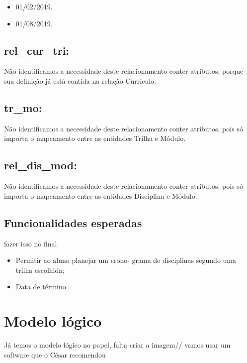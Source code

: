 \documentclass{report}
\begin{document}
\begin{itemize}
	\item 01/02/2019.
	\item 01/08/2019.
\end{itemize}
\subsection{rel\_cur\_tri:}
 Não identificamos a necessidade deste relacionamento conter atributos, porque
 sua definição já está contida na relação Currículo.
\subsection{tr\_mo:}
 Não identificamos a necessidade deste relacionamento conter atributos, pois só
 importa o mapeamento entre as entidades Trilha e Módulo.
\subsection{rel\_dis\_mod:}
 Não identificamos a necessidade deste relacionamento conter atributos, pois só
 importa o mapeamento entre as entidades Disciplina e Módulo.
\subsection{Funcionalidades esperadas}
{\huge fazer isso no final\par}
\begin{itemize}
  \item Permitir ao aluno planejar um crono-
grama de disciplinas segundo uma trilha
escolhida;
  \item Data de término
\end{itemize}
\section{Modelo lógico}
{\huge Já temos o modelo lógico no papel, falta criar a imagem//
vamos usar um software que o César recomendou\par}
\end{document}
